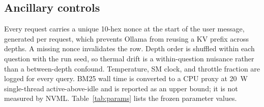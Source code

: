\subsection{Ancillary controls}

Every request carries a unique 10-hex nonce at the start of the user message, generated per
request, which prevents Ollama from reusing a KV prefix across depths. A missing nonce
invalidates the row. Depth order is shuffled within each question with the run seed, so thermal
drift is a within-question nuisance rather than a between-depth confound. Temperature, SM clock,
and throttle fraction are logged for every query. BM25 wall time is converted to a CPU proxy at
20~W single-thread active-above-idle and is reported as an upper bound; it is not measured by
NVML. Table~\ref{tab:params} lists the frozen parameter values.

